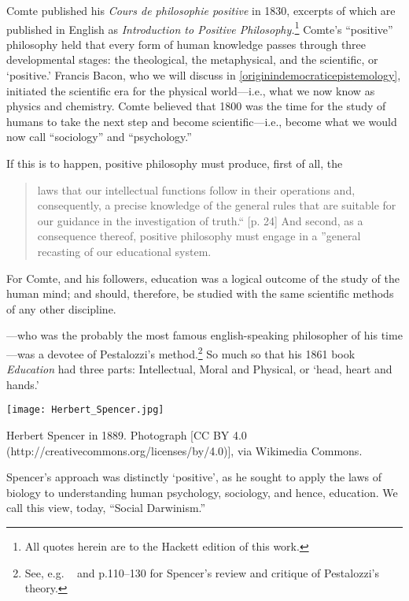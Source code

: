 Comte published his \emph{Cours de philosophie positive} in 1830, excerpts of which are published in English as \emph{Introduction to Positive Philosophy.}\footnote{All quotes herein are to the Hackett edition of this work.} Comte's ``positive'' philosophy held that every form of human knowledge passes through three developmental stages: the theological, the metaphysical, and the scientific, or `positive.' Francis Bacon, who we will discuss in \ref{originindemocraticepistemology}, initiated the scientific era for the physical world---i.e., what we now know as physics and chemistry. Comte believed that 1800 was the time for the study of humans to take the next step and become scientific---i.e., become what we would now call ``sociology'' and ``psychology.'' 

If this is to happen, positive philosophy must produce, first of all, the 

\begin{quote}

laws that our intellectual functions follow in their operations and, consequently, a precise knowledge of the general rules that are suitable for our guidance in the investigation of truth.`` [p. 24] And second, as a consequence thereof, positive philosophy must engage in a ''general recasting of our educational system. ~\citep[p. 24]{Comte:sZv664Ah}
\end{quote}

For Comte, and his followers, education was a logical outcome of the study of the human mind; and should, therefore, be studied with the same scientific methods of any other discipline.

---who was the probably the most famous english-speaking philosopher of his time---was a devotee of Pestalozzi's method.\footnote{See, e.g. ~\citep[p. 69]{Spencer:1861ts} and p.110--130 for Spencer's review and critique of Pestalozzi's theory.} So much so that his 1861 book \emph{Education} had three parts: Intellectual, Moral and Physical, or `head, heart and hands.'
\begin{marginfigure}\texttt{[image: Herbert\_Spencer.jpg]}\caption{Herbert Spencer in 1889. Photograph [CC BY 4.0 (http://creativecommons.org/licenses/by/4.0)], via Wikimedia Commons.}\label{fig:spencer}\end{marginfigure}Spencer's approach was distinctly `positive', as he sought to apply the laws of biology to understanding human psychology, sociology, and hence, education. We call this view, today, ``Social Darwinism.'' 

